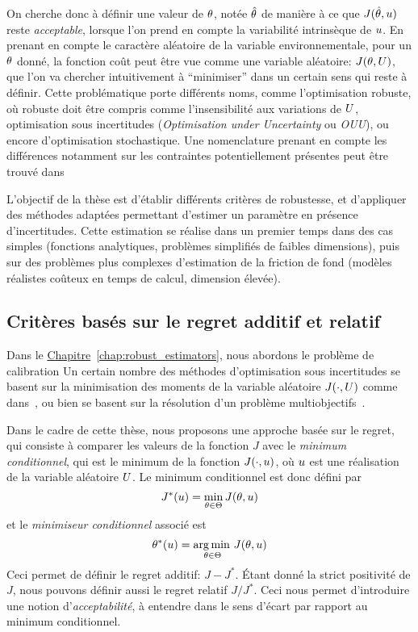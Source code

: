 \documentclass[../../Main_ManuscritThese.tex]{subfiles}
\newcommand{\frchap}[1]{\hyperref[#1]{Chapitre}~\ref{#1}}
\begin{document}
On cherche donc à définir une valeur de $\theta$, notée $\hat{\theta}$ de
manière à ce que $J(\hat{\theta}, u)$ reste \emph{acceptable}, lorsque
l'on prend en compte la variabilité intrinsèque de $u$.
En prenant en compte le caractère aléatoire de la variable
environnementale, pour un $\theta$ donné, la fonction coût peut être vue
comme une variable aléatoire: $J(\theta,U)$, que l'on va chercher
intuitivement à ``minimiser'' dans un certain sens qui reste à
définir.  Cette problématique porte différents noms, comme
l'optimisation robuste, où robuste doit être compris comme
l'insensibilité aux variations de $U$, optimisation sous
incertitudes (\emph{Optimisation under Uncertainty} ou \emph{OUU}), ou encore
d'optimisation stochastique. Une nomenclature prenant en compte les
différences notamment sur les contraintes potentiellement présentes
peut être trouvé dans~\cite{lelievre_consideration_2016}


L'objectif de la thèse est d'établir différents critères de
robustesse, et d'appliquer des méthodes adaptées permettant d'estimer
un paramètre en présence d'incertitudes. Cette estimation se réalise
dans un premier temps dans des cas simples (fonctions analytiques,
problèmes simplifiés de faibles dimensions), puis sur des problèmes
plus complexes d'estimation de la friction de fond (modèles réalistes
coûteux en temps de calcul, dimension élevée).

\subsection*{Critères basés sur le regret additif et relatif}
Dans le \frchap{chap:robust_estimators}, nous abordons le problème de
calibration 
Un certain nombre des méthodes
d'optimisation sous incertitudes se basent sur la minimisation des
moments de la variable aléatoire $J(\mathbf{\cdot}, U)$ comme
dans~\cite{lehman_designing_2004,janusevskis_simultaneous_2010}, ou
bien se basent sur la résolution d'un problème
multiobjectifs~\cite{baudoui_optimisation_2012,ribaud_krigeage_2018}.

Dans le cadre de cette thèse, nous proposons une approche basée sur le
regret, qui consiste à comparer les valeurs de la fonction $J$ avec le
\emph{minimum conditionnel}, qui est le minimum de la fonction
$J(\cdot, u)$, où $u$ est une réalisation de la variable aléatoire
$U$. Le minimum conditionnel est donc défini par
\begin{equation}
  \label{eq:Jstar}
  J^*(u) = \min_{\theta\in\Theta} J(\theta,u)
\end{equation}
et le \emph{minimiseur conditionnel} associé est
\begin{equation}
  \label{eq:Kstar}
  \theta^*(u) = \operatorname*{arg\,min \,}_{\theta\in \Theta}J(\theta,u)
\end{equation}
Ceci permet de définir le regret additif: $J - J^*$. Étant donné la
strict positivité de $J$, nous pouvons définir aussi le regret relatif
$J/J^*$. Ceci nous permet d'introduire une notion
d'\emph{acceptabilité}, à entendre dans le sens d'écart par rapport au
minimum conditionnel.
\end{document}
